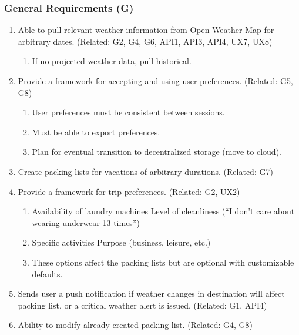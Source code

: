 \documentclass[11pt]{article}
\begin{document}
        \subsubsection{General Requirements (G)}
        \begin{enumerate}
        \item Able to pull relevant weather information from Open Weather Map for
        arbitrary dates. (Related: G2, G4, G6, API1, API3, API4, UX7, UX8)

        \begin{enumerate}
        \item If no projected weather data, pull historical.
        \end{enumerate}
        \item Provide a framework for accepting and using user preferences. (Related:
        G5, G8)

        \begin{enumerate}
        \item User preferences must be consistent between sessions. 
        \item Must be able to export preferences. 
        \item Plan for eventual transition to decentralized storage (move to cloud).
        \end{enumerate}
        \item Create packing lists for vacations of arbitrary durations. (Related:
        G7)
        \item Provide a framework for trip preferences. (Related: G2, UX2)

        \begin{enumerate}
        \item Availability of laundry machines Level of cleanliness (\textquotedblleft I
        don\textquoteright t care about wearing underwear 13 times\textquotedblright ) 
        \item Specific activities Purpose (business, leisure, etc.) 
        \item These options affect the packing lists but are optional with customizable
        defaults.
        \end{enumerate}
        \item Sends user a push notification if weather changes in destination will
        affect packing list, or a critical weather alert is issued. (Related:
        G1, API4)
        \item Ability to modify already created packing list. (Related: G4, G8)


\end{enumerate}
\end{document}
